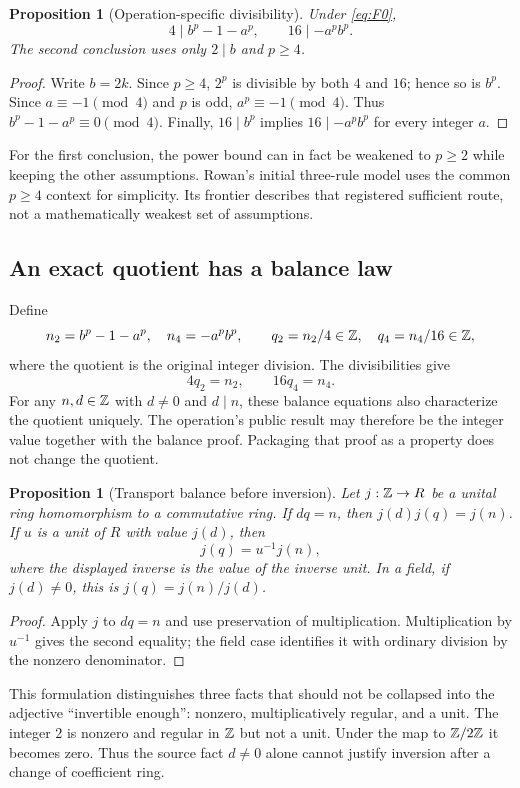 \documentclass[11pt,letterpaper]{article}
\newtheorem{proposition}[theorem]{Proposition}
\theoremstyle{definition}\newtheorem{definition}[theorem]{Definition}
\theoremstyle{remark}\newtheorem{remark}[theorem]{Remark}
\begin{document}
\begin{proposition}[Operation-specific divisibility]
Under \eqref{eq:F0},
\[
 4\mid b^p-1-a^p,\qquad 16\mid -a^pb^p.
\]
The second conclusion uses only $2\mid b$ and $p\ge4$.
\end{proposition}
\begin{proof}
Write $b=2k$. Since $p\ge4$, $2^p$ is divisible by both $4$ and $16$;
hence so is $b^p$. Since $a\equiv-1\pmod4$ and $p$ is odd,
$a^p\equiv-1\pmod4$. Thus $b^p-1-a^p\equiv0\pmod4$.
Finally, $16\mid b^p$ implies $16\mid -a^pb^p$ for every integer $a$.
\end{proof}

For the first conclusion, the power bound can in fact be weakened to $p\ge2$
while keeping the other assumptions. Rowan's initial three-rule model uses
the common $p\ge4$ context for simplicity. Its frontier describes that
registered sufficient route, not a mathematically weakest set of assumptions.

\subsection{An exact quotient has a balance law}
Define
\[
 n_2=b^p-1-a^p,\quad n_4=-a^pb^p,\qquad
 q_2=n_2/4\in\mathbb Z,\quad q_4=n_4/16\in\mathbb Z,
\]
where the quotient is the original integer division. The divisibilities give
\[
 4q_2=n_2,\qquad16q_4=n_4.
\]
For any $n,d\in\mathbb Z$ with $d\ne0$ and $d\mid n$, these balance equations
also characterize the quotient uniquely. The operation's public result may
therefore be the integer value together with the balance proof. Packaging
that proof as a property does not change the quotient.

\begin{proposition}[Transport balance before inversion]
Let $j:\mathbb Z\to R$ be a unital ring homomorphism to a commutative ring. If
$dq=n$, then $j(d)j(q)=j(n)$. If $u$ is a unit of $R$ with value $j(d)$,
then
\[
 j(q)=u^{-1}j(n),
\]
where the displayed inverse is the value of the inverse unit. In a field,
if $j(d)\ne0$, this is $j(q)=j(n)/j(d)$.
\end{proposition}
\begin{proof}
Apply $j$ to $dq=n$ and use preservation of multiplication. Multiplication
by $u^{-1}$ gives the second equality; the field case identifies it with
ordinary division by the nonzero denominator.
\end{proof}

This formulation distinguishes three facts that should not be collapsed into
the adjective ``invertible enough'': nonzero, multiplicatively regular, and
a unit. The integer $2$ is nonzero and regular in $\mathbb Z$ but not a unit.
Under the map to $\mathbb Z/2\mathbb Z$ it becomes zero. Thus the source fact $d\ne0$
alone cannot justify inversion after a change of coefficient ring.
\end{document}
